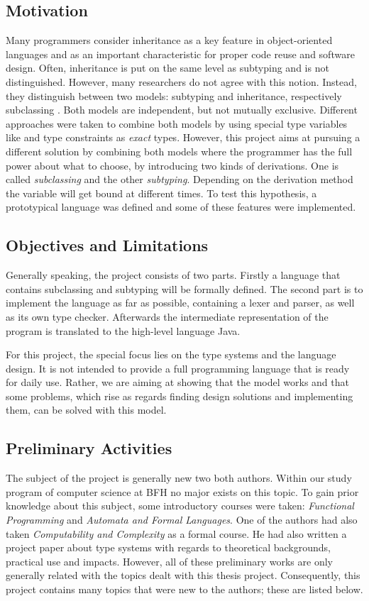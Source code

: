 \subsection{Motivation}
Many programmers consider inheritance as a key feature in object-oriented
languages and as an important characteristic for proper code reuse and
software design. Often, inheritance is put on the same level as subtyping
and is not distinguished. However, many researchers do not agree with
this notion. Instead, they distinguish between two models: subtyping and
inheritance, respectively subclassing \cite{taivalsaari_notion_1996}.
Both models are independent, but not mutually exclusive. Different approaches were
taken to combine both models by using special type variables like \mytype
and type constraints as \emph{exact} types. However, this project aims at
pursuing a different solution by combining both models where the programmer has
the full power about what to choose, by introducing two kinds of derivations.
One is called \emph{subclassing} and the other \emph{subtyping}. Depending
on the derivation method the \mytype variable will get bound at different
times. To test this hypothesis, a prototypical language was defined and some
of these features were implemented.

\subsection{Objectives and Limitations}
Generally speaking, the project consists of two parts. Firstly a language
that contains subclassing and subtyping will be formally defined. The
second part is to implement the language as far as possible, containing
a lexer and parser, as well as its own type checker. Afterwards the
intermediate representation of the program is translated to the high-level
language Java.

For this project, the special focus lies on the type systems and the language
design. It is not intended to provide a full programming language that is
ready for daily use. Rather, we are aiming at showing that the model works and that some
problems, which rise as regards finding design solutions and implementing them, can be solved
with this model.

\subsection{Preliminary Activities}
The subject of the project is generally new two both authors. Within
our study program of computer science at BFH no major exists on this topic. To gain prior
knowledge about this subject, some introductory courses were taken:
\emph{Functional Programming} and \emph{Automata and Formal Languages}.
One of the authors had also taken \emph{Computability and Complexity} as
a formal course. He had also written a project paper about type systems
with regards to theoretical backgrounds, practical use and impacts. However, all
of these preliminary works are only generally related with the topics dealt with
this thesis project. Consequently, this project contains many topics that
were new to the authors; these are listed below.

